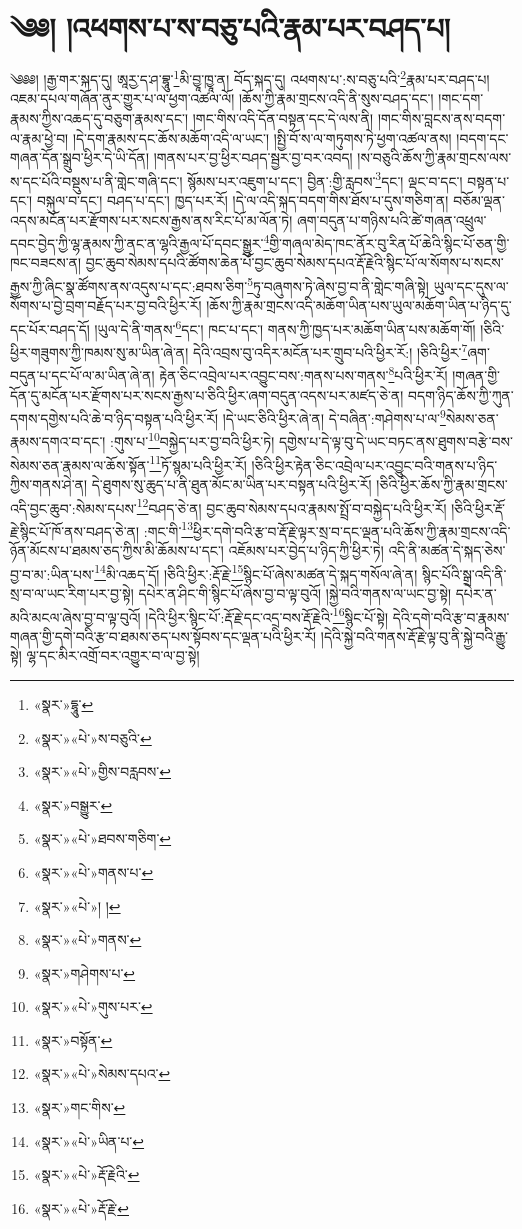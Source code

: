 \chapter{༄༅། །འཕགས་པ་ས་བཅུ་པའི་རྣམ་པར་བཤད་པ།}༄༅༅། །རྒྱ་གར་སྐད་དུ། ཨཱརྱ་ད་ཤ་བྷཱུ་\footnote{«སྣར་»དྷཱུ་}མི་བྱཱ་ཁྱཱ་ན། བོད་སྐད་དུ། འཕགས་པ་:ས་བཅུ་པའི་\footnote{«སྣར་»«པེ་»ས་བཅུའི་}རྣམ་པར་བཤད་པ། འཇམ་དཔལ་གཞོན་ནུར་གྱུར་པ་ལ་ཕྱག་འཚལ་ལོ། །ཆོས་ཀྱི་རྣམ་གྲངས་འདི་ནི་སུས་བཤད་དང་། །གང་དག་རྣམས་ཀྱིས་འཆད་དུ་བཅུག་རྣམས་དང་། །གང་གིས་འདི་དོན་བསྟན་དང་དེ་ལས་ནི། །གང་གིས་བླངས་ནས་བདག་ལ་རྣམ་ཕྱེ་བ། །དེ་དག་རྣམས་དང་ཆོས་མཆོག་འདི་ལ་ཡང་། །སྤྱི་བོ་ས་ལ་གཏུགས་ཏེ་ཕྱག་འཚལ་ནས། །བདག་དང་གཞན་དོན་སྒྲུབ་ཕྱིར་དེ་ཡི་དོན། །གནས་པར་བྱ་ཕྱིར་བཤད་སྦྱར་བྱ་བར་འབད། །ས་བཅུའི་ཆོས་ཀྱི་རྣམ་གྲངས་ལས་ས་དང་པོའི་བསྡུས་པ་ནི་གླེང་གཞི་དང་། སྙོམས་པར་འཇུག་པ་དང་། བྱིན་:གྱི་རླབས་\footnote{«སྣར་»«པེ་»གྱིས་བརླབས་}དང་། ལྡང་བ་དང་། བསྟན་པ་དང་། བསྐུལ་བ་དང་། བཤད་པ་དང་། ཁྱད་པར་རོ། །དེ་ལ་འདི་སྐད་བདག་གིས་ཐོས་པ་དུས་གཅིག་ན། བཅོམ་ལྡན་འདས་མངོན་པར་རྫོགས་པར་སངས་རྒྱས་ནས་རིང་པོ་མ་ལོན་ཏེ། ཞག་བདུན་པ་གཉིས་པའི་ཚེ་གཞན་འཕྲུལ་དབང་བྱེད་ཀྱི་ལྷ་རྣམས་ཀྱི་ནང་ན་ལྷའི་རྒྱལ་པོ་དབང་སྒྱུར་\footnote{«སྣར་»བསྒྱུར་}གྱི་གཞལ་མེད་ཁང་ནོར་བུ་རིན་པོ་ཆེའི་སྙིང་པོ་ཅན་གྱི་ཁང་བཟངས་ན། བྱང་ཆུབ་སེམས་དཔའི་ཚོགས་ཆེན་པོ་བྱང་ཆུབ་སེམས་དཔའ་རྡོ་རྗེའི་སྙིང་པོ་ལ་སོགས་པ་སངས་རྒྱས་ཀྱི་ཞིང་སྣ་ཚོགས་ནས་འདུས་པ་དང་:ཐབས་ཅིག་\footnote{«སྣར་»«པེ་»ཐབས་གཅིག་}ཏུ་བཞུགས་ཏེ་ཞེས་བྱ་བ་ནི་གླེང་གཞི་སྟེ། ཡུལ་དང་དུས་ལ་སོགས་པ་བྱེ་བྲག་བརྗོད་པར་བྱ་བའི་ཕྱིར་རོ། །ཆོས་ཀྱི་རྣམ་གྲངས་འདི་མཆོག་ཡིན་པས་ཡུལ་མཆོག་ཡིན་པ་ཉིད་དུ་དང་པོར་བཤད་དོ། །ཡུལ་དེ་ནི་གནས་\footnote{«སྣར་»«པེ་»གནས་པ་}དང་། ཁང་པ་དང་། གནས་ཀྱི་ཁྱད་པར་མཆོག་ཡིན་པས་མཆོག་གོ། །ཅིའི་ཕྱིར་གཟུགས་ཀྱི་ཁམས་སུ་མ་ཡིན་ཞེ་ན། དེའི་འབྲས་བུ་འདིར་མངོན་པར་གྲུབ་པའི་ཕྱིར་རོ:། །ཅིའི་ཕྱིར་\footnote{«སྣར་»«པེ་»། །}ཞག་བདུན་པ་དང་པོ་ལ་མ་ཡིན་ཞེ་ན། རྟེན་ཅིང་འབྲེལ་པར་འབྱུང་བས་:གནས་པས་གནས་\footnote{«སྣར་»«པེ་»གནས་}པའི་ཕྱིར་རོ། །གཞན་གྱི་དོན་དུ་མངོན་པར་རྫོགས་པར་སངས་རྒྱས་པ་ཅིའི་ཕྱིར་ཞག་བདུན་འདས་པར་མཛད་ཅེ་ན། བདག་ཉིད་ཆོས་ཀྱི་ཀུན་དགས་དགྱེས་པའི་ཆེ་བ་ཉིད་བསྟན་པའི་ཕྱིར་རོ། །དེ་ཡང་ཅིའི་ཕྱིར་ཞེ་ན། དེ་བཞིན་:གཤེགས་པ་ལ་\footnote{«སྣར་»གཤེགས་པ་}སེམས་ཅན་རྣམས་དགའ་བ་དང་། :གུས་པ་\footnote{«སྣར་»«པེ་»གུས་པར་}བསྐྱེད་པར་བྱ་བའི་ཕྱིར་ཏེ། དགྱེས་པ་དེ་ལྟ་བུ་དེ་ཡང་བཏང་ནས་ཐུགས་བརྩེ་བས་སེམས་ཅན་རྣམས་ལ་ཆོས་སྟོན་\footnote{«སྣར་»བསྟོན་}ཏོ་སྙམ་པའི་ཕྱིར་རོ། །ཅིའི་ཕྱིར་རྟེན་ཅིང་འབྲེལ་པར་འབྱུང་བའི་གནས་པ་ཉིད་ཀྱིས་གནས་ཤེ་ན། དེ་ཐུགས་སུ་ཆུད་པ་ནི་ཐུན་མོང་མ་ཡིན་པར་བསྟན་པའི་ཕྱིར་རོ། །ཅིའི་ཕྱིར་ཆོས་ཀྱི་རྣམ་གྲངས་འདི་བྱང་ཆུབ་:སེམས་དཔས་\footnote{«སྣར་»«པེ་»སེམས་དཔའ་}བཤད་ཅེ་ན། བྱང་ཆུབ་སེམས་དཔའ་རྣམས་སྤྲོ་བ་བསྐྱེད་པའི་ཕྱིར་རོ། །ཅིའི་ཕྱིར་རྡོ་རྗེ་སྙིང་པོ་ཁོ་ནས་བཤད་ཅེ་ན། :གང་གི་\footnote{«སྣར་»གང་གིས་}ཕྱིར་དགེ་བའི་རྩ་བ་རྡོ་རྗེ་ལྟར་སྲ་བ་དང་ལྡན་པའི་ཆོས་ཀྱི་རྣམ་གྲངས་འདི་ཉོན་མོངས་པ་ཐམས་ཅད་ཀྱིས་མི་ཆོམས་པ་དང་། འཇོམས་པར་བྱེད་པ་ཉིད་ཀྱི་ཕྱིར་ཏེ། འདི་ནི་མཚན་དེ་སྐད་ཅེས་བྱ་བ་མ་:ཡིན་པས་\footnote{«སྣར་»«པེ་»ཡིན་པ་}མི་འཆད་དོ། །ཅིའི་ཕྱིར་:རྡོ་རྗེ་\footnote{«སྣར་»«པེ་»རྡོ་རྗེའི་}སྙིང་པོ་ཞེས་མཚན་དེ་སྐད་གསོལ་ཞེ་ན། སྙིང་པོའི་སྒྲ་འདི་ནི་སྲ་བ་ལ་ཡང་རིག་པར་བྱ་སྟེ། དཔེར་ན་ཤིང་གི་སྙིང་པོ་ཞེས་བྱ་བ་ལྟ་བུའོ། །སྐྱེ་བའི་གནས་ལ་ཡང་བྱ་སྟེ། དཔེར་ན་མའི་མངལ་ཞེས་བྱ་བ་ལྟ་བུའོ། །དེའི་ཕྱིར་སྙིང་པོ་:རྡོ་རྗེ་དང་འདྲ་བས་རྡོ་རྗེའི་\footnote{«སྣར་»«པེ་»རྡོ་རྗེ་}སྙིང་པོ་སྟེ། དེའི་དགེ་བའི་རྩ་བ་རྣམས་གཞན་གྱི་དགེ་བའི་རྩ་བ་ཐམས་ཅད་པས་སྟོབས་དང་ལྡན་པའི་ཕྱིར་རོ། །དེའི་སྐྱེ་བའི་གནས་རྡོ་རྗེ་ལྟ་བུ་ནི་སྐྱེ་བའི་རྒྱུ་སྟེ། ལྷ་དང་མིར་འགྲོ་བར་འགྱུར་བ་ལ་བྱ་སྟེ། 